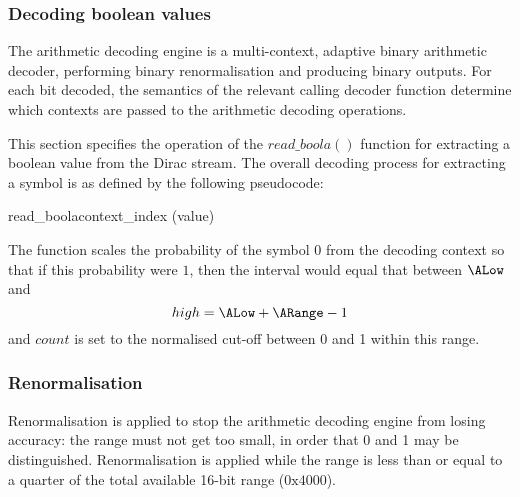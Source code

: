 \subsubsection{Decoding boolean values}
\label{arithreadbool}

The arithmetic decoding engine is a multi-context, adaptive binary
arithmetic decoder, performing binary renormalisation and producing
binary outputs. For each bit decoded, the semantics of the relevant
calling decoder function determine which contexts are passed to the
arithmetic decoding operations. 

This section specifies the operation of the $read\_boola()$ function
for extracting a boolean value from the Dirac stream. The overall decoding
process for extracting a symbol is as defined by the following
pseudocode:

\begin{pseudo}{read\_boola}{context\_index}
\bsELSE
\bsEND
{}
\bsEND
\bsRET(value)
\end{pseudo}

\begin{informative}
The function scales the probability of the symbol $0$ from the decoding context
so that if this probability were $1$, then the interval would equal that between
 $\ALow$ and 
 \[high=\ALow+\ARange-1\]
and $count$ is set to the normalised cut-off between 0 and 1 within this range.
\end{informative}

\subsubsection{Renormalisation}
\label{renormalisation}

Renormalisation is applied to stop the arithmetic decoding 
engine from losing accuracy: the range must not get too small,
 in order that 0 and 1 may be distinguished. Renormalisation is
 applied while the range is less than or equal to a quarter of 
 the total available 16-bit range ($\text{0x4000}$). 

